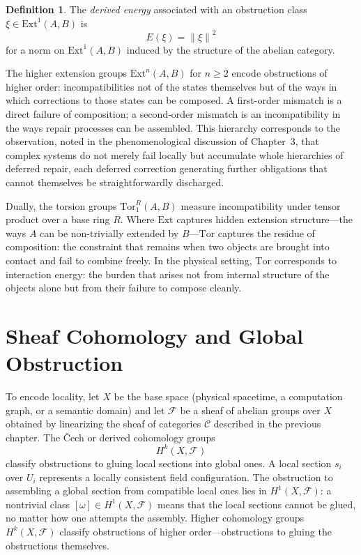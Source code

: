 \documentclass[12pt,a4paper,openany]{book}
\theoremstyle{plain}
\theoremstyle{definition}
\newtheorem{definition}[theorem]{Definition}
\theoremstyle{remark}
\newcommand{\Energy}{E}
\newcommand{\norm}[1]{\left\|#1\right\|}
\begin{document}
\begin{definition}
The \emph{derived energy} associated with an obstruction class $\xi \in \mathrm{Ext}^1(A, B)$ is
\[
\Energy(\xi) = \norm{\xi}^2
\]
for a norm on $\mathrm{Ext}^1(A, B)$ induced by the structure of the abelian category.
\end{definition}

The higher extension groups $\mathrm{Ext}^n(A, B)$ for $n \geq 2$ encode obstructions of higher order: incompatibilities not of the states themselves but of the ways in which corrections to those states can be composed. A first-order mismatch is a direct failure of composition; a second-order mismatch is an incompatibility in the ways repair processes can be assembled. This hierarchy corresponds to the observation, noted in the phenomenological discussion of Chapter~3, that complex systems do not merely fail locally but accumulate whole hierarchies of deferred repair, each deferred correction generating further obligations that cannot themselves be straightforwardly discharged.

Dually, the torsion groups $\mathrm{Tor}_1^R(A, B)$ measure incompatibility under tensor product over a base ring $R$. Where $\mathrm{Ext}$ captures hidden extension structure---the ways $A$ can be non-trivially extended by $B$---$\mathrm{Tor}$ captures the residue of composition: the constraint that remains when two objects are brought into contact and fail to combine freely. In the physical setting, $\mathrm{Tor}$ corresponds to interaction energy: the burden that arises not from internal structure of the objects alone but from their failure to compose cleanly.

\section{Sheaf Cohomology and Global Obstruction}

To encode locality, let $X$ be the base space (physical spacetime, a computation graph, or a semantic domain) and let $\mathcal{F}$ be a sheaf of abelian groups over $X$ obtained by linearizing the sheaf of categories $\mathcal{C}$ described in the previous chapter. The \v{C}ech or derived cohomology groups
\[
H^k(X, \mathcal{F})
\]
classify obstructions to gluing local sections into global ones. A local section $s_i$ over $U_i$ represents a locally consistent field configuration. The obstruction to assembling a global section from compatible local ones lies in $H^1(X, \mathcal{F})$: a nontrivial class $[\omega] \in H^1(X, \mathcal{F})$ means that the local sections cannot be glued, no matter how one attempts the assembly. Higher cohomology groups $H^k(X, \mathcal{F})$ classify obstructions of higher order---obstructions to gluing the obstructions themselves.
\end{document}
